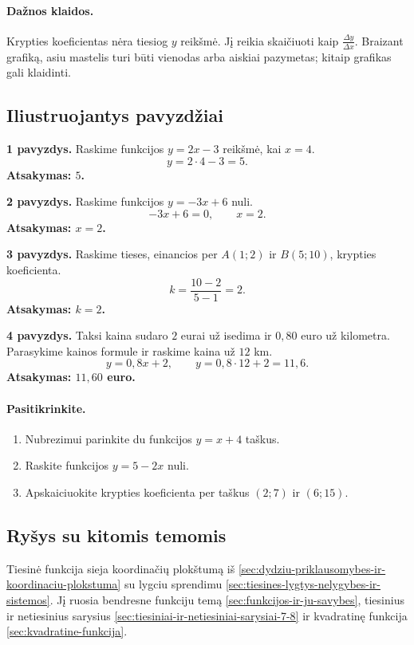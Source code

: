 \paragraph{Dažnos klaidos.}
Krypties koeficientas nėra tiesiog $y$ reikšmė. Jį reikia skaičiuoti kaip $\frac{\Delta y}{\Delta x}$. Braizant grafiką, asiu mastelis turi būti vienodas arba aiskiai pazymetas; kitaip grafikas gali klaidinti.

\subsection{Iliustruojantys pavyzdžiai}
\textbf{1 pavyzdys.} Raskime funkcijos $y=2x-3$ reikšmė, kai $x=4$.
\[
y=2\cdot4-3=5.
\]
\textbf{Atsakymas: $5$.}

\textbf{2 pavyzdys.} Raskime funkcijos $y=-3x+6$ nuli.
\[
-3x+6=0,\qquad x=2.
\]
\textbf{Atsakymas: $x=2$.}

\textbf{3 pavyzdys.} Raskime tieses, einancios per $A(1;2)$ ir $B(5;10)$, krypties koeficienta.
\[
k=\frac{10-2}{5-1}=2.
\]
\textbf{Atsakymas: $k=2$.}

\textbf{4 pavyzdys.} Taksi kaina sudaro $2$ eurai už isedima ir $0{,}80$ euro už kilometra. Parasykime kainos formule ir raskime kaina už $12$ km.
\[
y=0{,}8x+2,\qquad y=0{,}8\cdot12+2=11{,}6.
\]
\textbf{Atsakymas: $11{,}60$ euro.}

\paragraph{Pasitikrinkite.}
\begin{enumerate}[label=\alph*)]
\item Nubrezimui parinkite du funkcijos $y=x+4$ taškus.
\item Raskite funkcijos $y=5-2x$ nuli.
\item Apskaiciuokite krypties koeficienta per taškus $(2;7)$ ir $(6;15)$.
\end{enumerate}

\subsection{Ryšys su kitomis temomis}
Tiesinė funkcija sieja koordinačių plokštumą iš \ref{sec:dydziu-priklausomybes-ir-koordinaciu-plokstuma} su lygciu sprendimu \ref{sec:tiesines-lygtys-nelygybes-ir-sistemos}. Jį ruosia bendresne funkciju temą \ref{sec:funkcijos-ir-ju-savybes}, tiesinius ir netiesinius sarysius \ref{sec:tiesiniai-ir-netiesiniai-sarysiai-7-8} ir kvadratinę funkcija \ref{sec:kvadratine-funkcija}.

